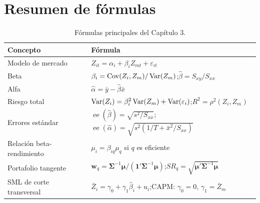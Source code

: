 \section{Resumen de fórmulas}

\begin{table}[H]
\centering\small
\begin{tabular}{@{}ll@{}}
\toprule
Concepto & Fórmula \\
\midrule
Modelo de mercado & $Z_{it}=\alpha_i+\beta_iZ_{mt}+\varepsilon_{it}$ \\
Beta & $\beta_i=\operatorname{Cov}(Z_i,Z_m)/\operatorname{Var}(Z_m)$;\quad $\hat\beta=S_{xy}/S_{xx}$ \\
Alfa & $\hat\alpha=\bar y-\hat\beta\bar x$ \\
Riesgo total & $\operatorname{Var}(Z_i)=\beta_i^2\operatorname{Var}(Z_m)+\operatorname{Var}(\varepsilon_i)$;\quad $R^2=\rho^2(Z_i,Z_m)$ \\
Errores estándar & $\operatorname{ee}(\hat\beta)=\sqrt{s^2/S_{xx}}$;\quad $\operatorname{ee}(\hat\alpha)=\sqrt{s^2(1/T+\bar x^2/S_{xx})}$ \\
Relación beta-rendimiento & $\mu_i=\beta_{iq}\mu_q$ si $q$ es eficiente \\
Portafolio tangente & $\bm w_q=\bm\Sigma^{-1}\bm\mu/(\bm1'\bm\Sigma^{-1}\bm\mu)$;\quad $SR_q=\sqrt{\bm\mu'\bm\Sigma^{-1}\bm\mu}$ \\
SML de corte transversal & $\bar Z_i=\gamma_0+\gamma_1\hat\beta_i+u_i$;\quad CAPM: $\gamma_0=0$, $\gamma_1=\bar Z_m$ \\
\bottomrule
\end{tabular}
\caption{Fórmulas principales del Capítulo 3.}
\end{table}

